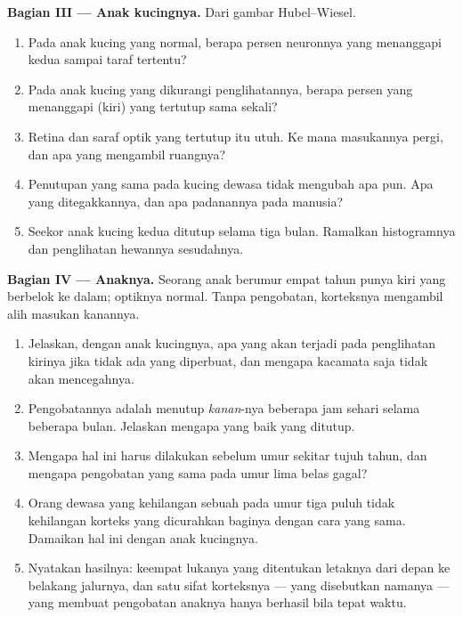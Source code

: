 \begin{problem}
\medskip
\noindent\textbf{Bagian III --- Anak kucingnya.}
Dari gambar Hubel--Wiesel.
\begin{enumerate}[resume]
  \item Pada anak kucing yang normal, berapa persen neuronnya yang
        menanggapi kedua  sampai taraf tertentu?
  \item Pada anak kucing yang dikurangi penglihatannya, berapa persen
        yang menanggapi  (kiri) yang tertutup sama sekali?
  \item Retina dan saraf optik  yang tertutup itu utuh. Ke mana
        masukannya pergi, dan apa yang mengambil ruangnya?
  \item Penutupan yang sama pada kucing dewasa tidak mengubah apa pun.
        Apa yang ditegakkannya, dan apa padanannya pada manusia?
  \item Seekor anak kucing kedua  ditutup selama tiga bulan.
        Ramalkan histogramnya dan penglihatan hewannya sesudahnya.
\end{enumerate}

\medskip
\noindent\textbf{Bagian IV --- Anaknya.}
Seorang anak berumur empat tahun punya  kiri yang berbelok ke
dalam; optiknya normal. Tanpa pengobatan, korteksnya mengambil alih
masukan  kanannya.
\begin{enumerate}[resume]
  \item Jelaskan, dengan anak kucingnya, apa yang akan terjadi pada
        penglihatan  kirinya jika tidak ada yang diperbuat, dan
        mengapa kacamata saja tidak akan mencegahnya.
  \item Pengobatannya adalah menutup  \emph{kanan}-nya beberapa jam
        sehari selama beberapa bulan. Jelaskan mengapa  yang baik
        yang ditutup.
  \item Mengapa hal ini harus dilakukan sebelum umur sekitar tujuh
        tahun, dan mengapa pengobatan yang sama pada umur lima belas gagal?
  \item Orang dewasa yang kehilangan sebuah  pada umur tiga puluh
        tidak kehilangan korteks yang dicurahkan baginya dengan cara
        yang sama. Damaikan hal ini dengan anak kucingnya.
  \item Nyatakan hasilnya: keempat lukanya yang ditentukan letaknya
        dari depan ke belakang jalurnya, dan satu sifat korteksnya ---
        yang disebutkan namanya --- yang membuat pengobatan anaknya
        hanya berhasil bila tepat waktu.
\end{enumerate}
\end{problem}
